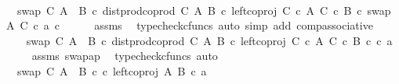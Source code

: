 \begin{isabellebody}
\ \ \isamarkupfalse%
\ \isamarkupfalse%
\ {\isachardoublequoteopen}{\isachardot}{\kern0pt}{\isachardot}{\kern0pt}{\isachardot}{\kern0pt}\ {\isacharequal}{\kern0pt}\ swap\ C\ {\isacharparenleft}{\kern0pt}A\ {\isasymCoprod}\ B{\isacharparenright}{\kern0pt}\ {\isasymcirc}\isactrlsub c\ dist{\isacharunderscore}{\kern0pt}prod{\isacharunderscore}{\kern0pt}coprod\ C\ A\ B\ {\isasymcirc}\isactrlsub c\ left{\isacharunderscore}{\kern0pt}coproj\ {\isacharparenleft}{\kern0pt}C\ {\isasymtimes}\isactrlsub c\ A{\isacharparenright}{\kern0pt}\ {\isacharparenleft}{\kern0pt}C\ {\isasymtimes}\isactrlsub c\ B{\isacharparenright}{\kern0pt}\ {\isasymcirc}\isactrlsub c\ swap\ A\ C\ {\isasymcirc}\isactrlsub c\ {\isasymlangle}a{\isacharcomma}{\kern0pt}\ c{\isasymrangle}{\isachardoublequoteclose}\isanewline
\ \ \ \ \isamarkupfalse%
\ assms\ \isamarkupfalse%
\ {\isacharparenleft}{\kern0pt}typecheck{\isacharunderscore}{\kern0pt}cfuncs{\isacharcomma}{\kern0pt}\ auto\ simp\ add{\isacharcolon}{\kern0pt}\ comp{\isacharunderscore}{\kern0pt}associative{}{\isacharparenright}{\kern0pt}\isanewline
\ \ \isamarkupfalse%
\ \isamarkupfalse%
\ {\isachardoublequoteopen}{\isachardot}{\kern0pt}{\isachardot}{\kern0pt}{\isachardot}{\kern0pt}\ {\isacharequal}{\kern0pt}\ swap\ C\ {\isacharparenleft}{\kern0pt}A\ {\isasymCoprod}\ B{\isacharparenright}{\kern0pt}\ {\isasymcirc}\isactrlsub c\ dist{\isacharunderscore}{\kern0pt}prod{\isacharunderscore}{\kern0pt}coprod\ C\ A\ B\ {\isasymcirc}\isactrlsub c\ left{\isacharunderscore}{\kern0pt}coproj\ {\isacharparenleft}{\kern0pt}C\ {\isasymtimes}\isactrlsub c\ A{\isacharparenright}{\kern0pt}\ {\isacharparenleft}{\kern0pt}C\ {\isasymtimes}\isactrlsub c\ B{\isacharparenright}{\kern0pt}\ {\isasymcirc}\isactrlsub c\ {\isasymlangle}c{\isacharcomma}{\kern0pt}\ a{\isasymrangle}{\isachardoublequoteclose}\isanewline
\ \ \ \ \isamarkupfalse%
\ assms\ swap{\isacharunderscore}{\kern0pt}ap\ \isamarkupfalse%
\ {\isacharparenleft}{\kern0pt}typecheck{\isacharunderscore}{\kern0pt}cfuncs{\isacharcomma}{\kern0pt}\ auto{\isacharparenright}{\kern0pt}\isanewline
\ \ \isamarkupfalse%
\ \isamarkupfalse%
\ {\isachardoublequoteopen}{\isachardot}{\kern0pt}{\isachardot}{\kern0pt}{\isachardot}{\kern0pt}\ {\isacharequal}{\kern0pt}\ swap\ C\ {\isacharparenleft}{\kern0pt}A\ {\isasymCoprod}\ B{\isacharparenright}{\kern0pt}\ {\isasymcirc}\isactrlsub c\ {\isasymlangle}c{\isacharcomma}{\kern0pt}\ left{\isacharunderscore}{\kern0pt}coproj\ A\ B\ {\isasymcirc}\isactrlsub c\ a{\isasymrangle}{\isachardoublequoteclose}\isanewline

\end{isabellebody}
